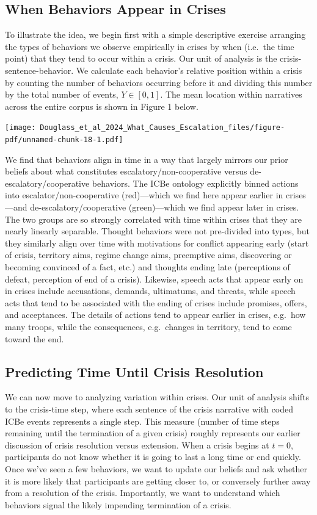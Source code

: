 \documentclass[
]{article}
\begin{document}
\subsection{When Behaviors Appear in
Crises}\label{when-behaviors-appear-in-crises}

To illustrate the idea, we begin first with a simple descriptive
exercise arranging the types of behaviors we observe empirically in
crises by when (i.e.~the time point) that they tend to occur within a
crisis. Our unit of analysis is the crisis-sentence-behavior. We
calculate each behavior's relative position within a crisis by counting
the number of behaviors occurring before it and dividing this number by
the total number of events, \(Y∈[0,1]\). The mean location within
narratives across the entire corpus is shown in Figure 1 below.

\texttt{[image: Douglass\_et\_al\_2024\_What\_Causes\_Escalation\_files/figure-pdf/unnamed-chunk-18-1.pdf]}

We find that behaviors align in time in a way that largely mirrors our
prior beliefs about what constitutes escalatory/non-cooperative versus
de-escalatory/cooperative behaviors. The ICBe ontology explicitly binned
actions into escalator/non-cooperative (red)---which we find here appear
earlier in crises---and de-escalatory/cooperative (green)---which we
find appear later in crises. The two groups are so strongly correlated
with time within crises that they are nearly linearly separable. Thought
behaviors were not pre-divided into types, but they similarly align over
time with motivations for conflict appearing early (start of crisis,
territory aims, regime change aims, preemptive aims, discovering or
becoming convinced of a fact, etc.) and thoughts ending late
(perceptions of defeat, perception of end of a crisis). Likewise, speech
acts that appear early on in crises include accusations, demands,
ultimatums, and threats, while speech acts that tend to be associated
with the ending of crises include promises, offers, and acceptances. The
details of actions tend to appear earlier in crises, e.g.~how many
troops, while the consequences, e.g.~changes in territory, tend to come
toward the end.

\subsection{Predicting Time Until Crisis
Resolution}\label{predicting-time-until-crisis-resolution}

We can now move to analyzing variation within crises. Our unit of
analysis shifts to the crisis-time step, where each sentence of the
crisis narrative with coded ICBe events represents a single step. This
measure (number of time steps remaining until the termination of a given
crisis) roughly represents our earlier discussion of crisis resolution
versus extension. When a crisis begins at \(t=0\), participants do not
know whether it is going to last a long time or end quickly. Once we've
seen a few behaviors, we want to update our beliefs and ask whether it
is more likely that participants are getting closer to, or conversely
further away from a resolution of the crisis. Importantly, we want to
understand which behaviors signal the likely impending termination of a
crisis.
\end{document}
